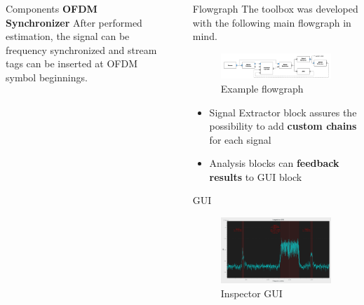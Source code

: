 \documentclass{beamer}
\begin{document}
\begin{frame}
\begin{columns}[t]
\begin{column}{0.33\textwidth}
\begin{block}{Components}
\textbf{OFDM Synchronizer}
After performed estimation, the signal can be frequency synchronized and stream tags can be inserted at OFDM symbol beginnings.
      \end{block}
    \end{column}
    \begin{column}{0.01\textwidth}
    \end{column}
    \begin{column}{0.66\textwidth}
      \begin{block}{Flowgraph}
        The toolbox was developed with the following main flowgraph in mind.
        \begin{figure}
          \includegraphics[width=\textwidth]{figures/flowgraph}
          \caption{Example flowgraph}
        \end{figure}
        \begin{itemize}
          \item Signal Extractor block assures the possibility to add \textbf{custom chains} for each signal 
          \item Analysis blocks can \textbf{feedback results} to GUI block
        \end{itemize}
      \end{block}
      \begin{block}{GUI}
      \begin{figure}
      	\includegraphics[width=\textwidth]{figures/gui.png}
      	\caption{Inspector GUI}

\end{figure}
\end{block}
\end{column}
\end{columns}
\end{frame}
\end{document}
